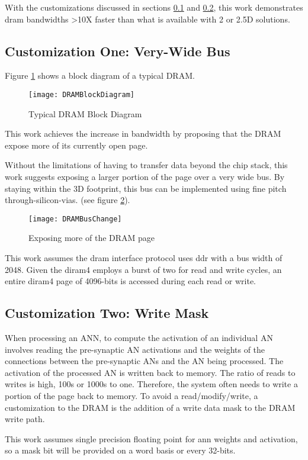 With the customizations discussed in sections \ref{sec:Very-Wide Bus} and \ref{sec:Write Mask}, this work demonstrates \ac{dram} bandwidths >10X faster than what is available with 2 or 2.5D solutions.

\subsection{Customization One: Very-Wide Bus}
\label{sec:Very-Wide Bus}

Figure \ref{fig:dramBlockDiagram} shows a block diagram of a typical DRAM.

\begin{figure}[!t]
\centering
\captionsetup{justification=centering}
\centerline{
\mbox{\texttt{[image: DRAMBlockDiagram]}}
}
\caption{Typical DRAM Block Diagram \cite{micron_ddr3}}
\label{fig:dramBlockDiagram}
\end{figure}

This work achieves the increase in bandwidth by proposing that the DRAM expose more of its currently open page.

Without the limitations of having to transfer data beyond the chip stack, this work suggests exposing a larger portion of the page over a very wide bus. By staying within the 3D footprint, this bus can be implemented using fine pitch through-silicon-vias.
(see figure \ref{fig:dramBusChange}).

\begin{figure}[!t]
\centering
\captionsetup{justification=centering}
\captionsetup{width=.75\linewidth}
\centerline{
\mbox{\texttt{[image: DRAMBusChange]}}
}
\caption{Exposing more of the DRAM page}
\label{fig:dramBusChange}
\end{figure}

This work assumes the \ac{dram} interface protocol uses \ac{ddr} with a bus width of 2048. Given the \ac{diram4} employs a burst of two for read and write cycles, an entire \ac{diram4} page of 4096-bits is accessed during each read or write. 

\subsection{Customization Two: Write Mask}
\label{sec:Write Mask}
When processing an ANN, to compute the activation of an individual AN involves reading the pre-synaptic AN activations and the weights of the connections between the pre-synaptic ANs and the AN being processed. The activation of the processed AN is written back to memory. The ratio of reads to writes is high, 100s or 1000s to one. Therefore, the system often needs to write a portion of the page back to memory. To avoid a read/modify/write, a customization to the DRAM is the addition of a write data mask to the DRAM write path.

This work assumes single precision floating point for \ac{ann} weights and activation, so a mask bit will be provided on a word basis or every 32-bits.

